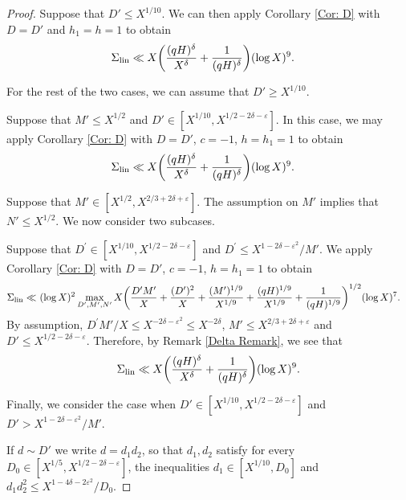\documentclass[12pt]{amsart}
\numberwithin{equation}{section}
\theoremstyle{remark}
\theoremstyle{definition}
\begin{document}
\begin{proof}
  Suppose that $D'\leq X^{1/10}$. We can then apply Corollary \ref{Cor: D} with $D=D'$ and $h_1=h=1$ to obtain
\begin{align}\notag
\Sigma_{\textup{lin}} &\ll   X\bigg(\dfrac{(qH)^\delta}{X^\delta} + \dfrac{1}{(qH)^\delta}\bigg)(\log X)^9.
\end{align}


For the rest of the two cases, we can assume that $D'\geq X^{1/10}$.

 Suppose that $M'\leq X^{1/2}$ and $D'\in [X^{1/10}, X^{1/2-2\delta-\varepsilon}]$. In this case, we may apply Corollary \ref{Cor: D} with $D=D'$, $c=-1$, $h=h_1=1$ to obtain
\begin{align}
\notag \Sigma_{\textup{lin}} & \ll  X\bigg(\dfrac{(qH)^\delta}{X^\delta} + \dfrac{1}{(qH)^\delta}\bigg)(\log X)^9.
\end{align}


 Suppose that $M'\in [X^{1/2}, X^{2/3+2\delta+\varepsilon}]$.  The assumption on $M'$ implies that $N'\leq X^{1/2}$. We now consider two subcases.

 Suppose that $D^\prime \in [X^{1/10}, X^{1/2-2\delta-\varepsilon}]$ and $D^\prime \leq X^{1-2\delta-\varepsilon^2}/M'$. 
We apply Corollary \ref{Cor: D} with $D=D'$, $c=-1$, $h=h_1=1$ to obtain
\begin{align}
\notag \Sigma_{ \textup{lin}} \ll &~(\log X)^2\max_{D', M', N'} X\bigg(\dfrac{D'M'}{X} + \dfrac{(D')^2}{X} + \dfrac{(M')^{1/9}}{X^{1/9}} + \dfrac{(qH)^{1/9}}{X^{1/9}} + \dfrac{1}{(qH)^{1/9}}\bigg)^{1/2}(\log X)^7.
\end{align}
By assumption, $D^\prime M'/X \leq X^{-2\delta-\varepsilon^2} \leq X^{-2\delta}$, $M'\leq X^{2/3+2\delta+\varepsilon}$ and $D'\leq X^{1/2-2\delta-\varepsilon}$. Therefore, by Remark \ref{Delta Remark}, we see that
\begin{align}
\notag \Sigma_{ \textup{lin}}\ll  X\bigg(\dfrac{(qH)^\delta}{X^\delta} + \dfrac{1}{(qH)^\delta}\bigg)(\log X)^9.
\end{align}


 Finally, we consider the case when $D' \in [X^{1/10}, X^{1/2-2\delta-\varepsilon}]$ and $D' >X^{1-2\delta-\varepsilon^2}/M'$. 

If $d\sim D'$ we write $d=d_1d_2$, so that
 $d_1, d_2$ satisfy for every $D_0 \in [X^{1/5}, X^{1/2-2\delta-\varepsilon}]$, the inequalities $d_1\in [X^{1/10}, D_0]$ and $d_1d_2^2 \leq X^{1-4\delta-2\varepsilon^2}/D_0$. 


\end{proof}
\end{document}
